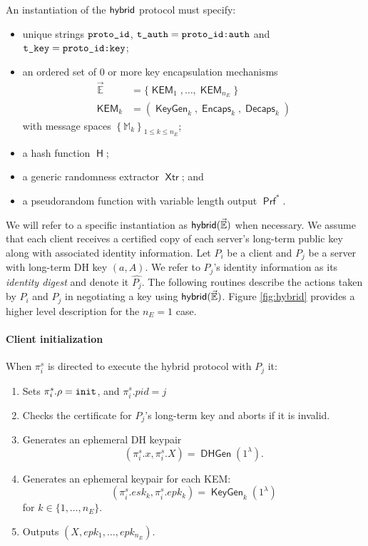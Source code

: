 \documentclass[USenglish,oneside,twocolumn]{article}
\theoremstyle{dgthm}
\theoremstyle{dgdef}
\newcommand{\hybrid}{{\sf {hybrid}}}
\newcommand{\AlgorithmName}[1]{\operatorname{\mathsf{#1}}}
\newcommand{\Hash}{\AlgorithmName{H}}
\newcommand{\KeyGen}{\AlgorithmName{KeyGen}}
\newcommand{\Encaps}{\AlgorithmName{Encaps}}
\newcommand{\Decaps}{\AlgorithmName{Decaps}}
\newcommand{\dhgen}{\AlgorithmName{DHGen}}
\newcommand{\PRF}{\AlgorithmName{Prf}}
\newcommand{\XTR}{\AlgorithmName{Xtr}}
\newcommand{\p}[2]{\pi_{#1}^{#2}}
\newcommand{\Token}[1]{\textnormal{\tt{#1}}}
\newcommand{\init}{\Token{init}}
\begin{document}
  An instantiation of the $\hybrid$ protocol must specify:
  \begin{itemize}
   \item unique strings $\Token{proto\_id}$,
     $\Token{t\_auth} = \Token{proto\_id:auth}$ and $\Token{t\_key} = \Token{proto\_id:key}$;
   \item an ordered set of $0$ or more key encapsulation mechanisms
     \begin{align*}
     \vec{\mathbb{E}} &= \{\AlgorithmName{KEM}_1, \dots, \AlgorithmName{KEM}_{n_E}\}\\
     \AlgorithmName{KEM}_k &= (\KeyGen_k, \Encaps_k, \Decaps_k)
     \end{align*}
     with message spaces $\left\{\mathbb{M}_k\right\}_{1\le k \le n_E}$;
   \item a hash function $\Hash$;
   \item a generic randomness extractor $\XTR$; and
   \item a pseudorandom function with variable length output $\PRF^*$.
  \end{itemize}

  We will refer to a specific instantiation as $\hybrid(\vec{\mathbb{E}})$ when
  necessary. We assume that each client receives a certified copy of each
  server's long-term public key along with associated identity information. Let
  $P_i$ be a client and $P_j$ be a server with long-term DH key $(a, A)$.  We
  refer to $P_j$'s identity information as its \emph{identity digest} and
  denote it $\widehat{P_j}$. The following routines describe the actions taken
  by $P_i$ and $P_j$ in negotiating a key using $\hybrid(\vec{\mathbb{E}})$.
  Figure \ref{fig:hybrid} provides a higher level description for the $n_E = 1$
  case.

  \paragraph*{Client initialization}
  When $\p{i}{s}$ is directed to execute the hybrid protocol with $P_j$ it:
  \begin{enumerate}
    \item Sets $\p{i}{s}.\rho = \init$, and $\p{i}{s}.pid = j$
    \item Checks the certificate for $P_j$'s long-term key and aborts if it is invalid.
    \item Generates an ephemeral DH keypair \[(\p{i}{s}.x,\p{i}{s}.X) = \dhgen(1^\lambda).\]
    \item Generates an ephemeral keypair for each KEM:
      \[(\p{i}{s}.esk_k, \p{i}{s}.epk_k) = \KeyGen_k(1^\lambda)\]
      for $k \in \{1,\dots,n_E\}$.
    \item Outputs $(X, epk_1, \dots, epk_{n_E})$.
  \end{enumerate}
\end{document}
